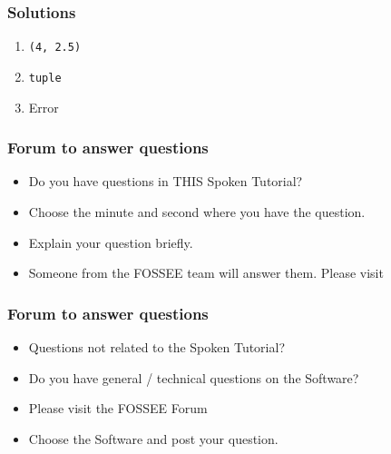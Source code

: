 \documentclass[17pt]{beamer}
\begin{document}
\begin{frame}
\frametitle{Solutions}
\label{sec-7}


\begin{enumerate}
\item \texttt{(4, 2.5)}
\vspace{12pt}
\item \texttt{tuple}
\vspace{12pt}
\item Error
\end{enumerate}
\end{frame}

\begin{frame}
\frametitle{Forum to answer questions}
\begin{itemize}
\item Do you have questions in THIS Spoken Tutorial?
\item Choose the minute and second where you have the question.
\item Explain your question briefly.
\item Someone from the FOSSEE team will answer them. Please visit 
\end{itemize}
\begin{center}
{\color{blue}{http://forums.spoken-tutorial.org/}}
 \end{center} 
\end{frame}

\begin{frame}
\frametitle{Forum to answer questions}
\begin{itemize}
\item Questions not related to the Spoken Tutorial?
\item Do you have general / technical questions on the Software?
\item Please visit the FOSSEE Forum
\begin{center}
{\color{blue}{http://forums.fossee.in/}}
 \end{center}
\item Choose the Software and post your question.
\end{itemize}
\end{frame}
\end{document}
